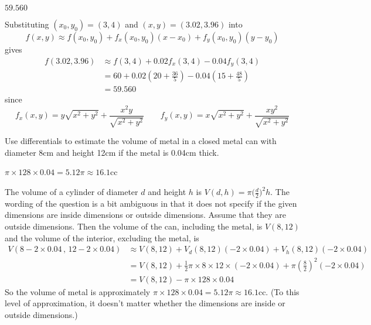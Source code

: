
\begin{answer}
$59.560$
\end{answer}

\begin{solution}
Substituting $(x_0,y_0)=(3,4)$ and $(x,y)=(3.02,3.96)$ into
\begin{equation*}
f(x,y)\approx f(x_0,y_0)+f_x(x_0,y_0)(x-x_0)+f_y(x_0,y_0)(y-y_0)
\end{equation*}
gives 
\begin{align*}
f(3.02,3.96)&\approx f(3,4)+0.02f_x(3,4)-0.04f_y(3,4)\\
&=60+0.02\left(20+\frac{36}{5}\right)-0.04\left(15+\frac{48}{5}\right)\\
&=59.560
\end{align*}
since
\begin{equation*}
f_x(x,y)=y\sqrt{x^2+y^2}+\frac{x^2y}{\sqrt{x^2+y^2}}\qquad
f_y(x,y)=x\sqrt{x^2+y^2}+\frac{xy^2}{\sqrt{x^2+y^2}}
\end{equation*}
\end{solution}

\begin{question}[M200 2000D] %
Use differentials to estimate the volume of metal in a closed
metal can with diameter 8cm and height 12cm if the metal is 0.04cm thick. 
\end{question}

%

\begin{answer}
$\pi\times 128\times 0.04=
5.12\pi\approx 16.1$cc
\end{answer}

\begin{solution}
The volume of a cylinder of diameter $d$ and height $h$ 
is $V(d,h)=\pi\big(\frac{d}{2}\big)^2h$. The wording of the question is
a bit ambiguous in that it does not specify if the given dimensions are
inside dimensions or outside dimensions. Assume that they are outside
dimensions. Then the volume of the can, including the metal, is $V(8,12)$
and the volume of the interior, excluding the metal, is 
\begin{align*}
V(8-2\times0.04\,,\,12-2\times 0.04)
&\approx  V(8,12)
+V_d(8,12)(-2\times 0.04)
+V_h(8,12)(-2\times 0.04)\\
&=V(8,12)
+\frac{1}{2}\pi\times 8\times 12\times(-2\times 0.04)
+\pi\left(\frac{8}{2}\right)^2\!\!(-2\times 0.04)\\
&=V(8,12)
-\pi\times 128\times 0.04
\end{align*}
So the volume of metal is approximately $\pi\times 128\times 0.04=
5.12\pi\approx 16.1$cc. (To this level of approximation, it doesn't matter
whether the dimensions are inside or outside dimensions.)
\end{solution}

